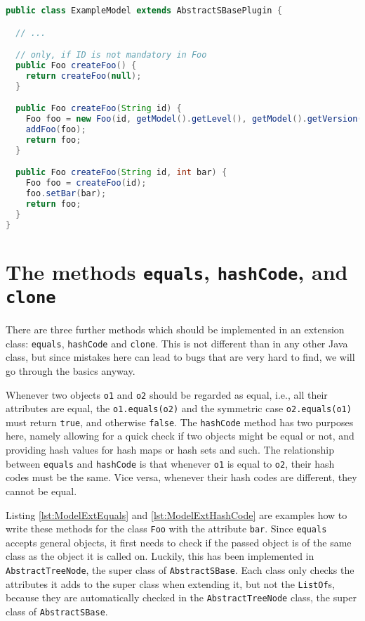 \begin{lstlisting}[language=Java,caption={Convenience method to create elements},label={lst:ModelExtCreateMethods}]
public class ExampleModel extends AbstractSBasePlugin {

  // ...

  // only, if ID is not mandatory in Foo
  public Foo createFoo() {
    return createFoo(null);
  }

  public Foo createFoo(String id) {
    Foo foo = new Foo(id, getModel().getLevel(), getModel().getVersion());
    addFoo(foo);
    return foo;
  }

  public Foo createFoo(String id, int bar) {
    Foo foo = createFoo(id);
    foo.setBar(bar);
    return foo;
  }
}
\end{lstlisting}


\section{The methods \texttt{equals}, \texttt{hashCode}, and \texttt{clone}}

There are three further methods which should be implemented in an extension
class: \texttt{equals}, \texttt{hashCode} and \texttt{clone}.
This is not different than in any other Java class, but since mistakes here can
lead to bugs that are very hard to find, we will go through the basics anyway.

Whenever two objects \texttt{o1} and \texttt{o2} should be regarded as equal,
i.e., all their attributes are equal, the \texttt{o1.equals(o2)} and the
symmetric case \texttt{o2.equals(o1)} must return \texttt{true}, and otherwise
\texttt{false}. The \texttt{hashCode} method has two purposes here, namely
allowing for a quick check if two objects might be equal or not, and providing
hash values for hash maps or hash sets and such. The relationship between
\texttt{equals} and \texttt{hashCode} is that whenever \texttt{o1} is equal to
\texttt{o2}, their hash codes must be the same. Vice versa, whenever their hash
codes are different, they cannot be equal.

Listing \ref{lst:ModelExtEquals} and \ref{lst:ModelExtHashCode} are examples
how to write these methods for the class \texttt{Foo} with the attribute \texttt{bar}.
Since \texttt{equals} accepts general objects, it first needs to check if the
passed object is of the same class as the object it is called on.
Luckily, this has been implemented in \texttt{AbstractTreeNode}, the super
class of \texttt{AbstractSBase}. Each class only checks the attributes it adds
to the super class when extending it, but not the \texttt{ListOf}s, because
they are automatically checked in the \texttt{AbstractTreeNode} class, the
super class of \texttt{AbstractSBase}.

